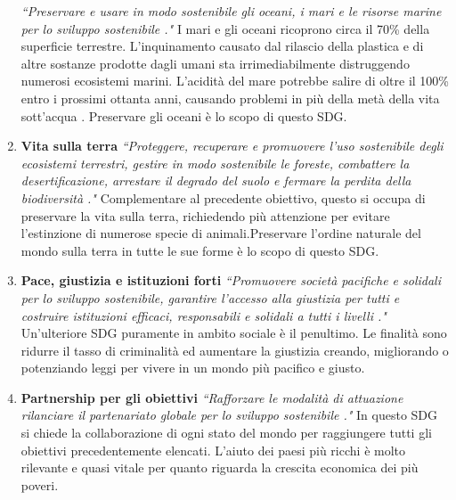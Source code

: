 \begin{enumerate}
\textit{``Preservare e usare in modo sostenibile gli oceani, i mari e le risorse marine per lo sviluppo sostenibile \cite{goals}."}\newline
I mari e gli oceani ricoprono circa il 70\% della superficie terrestre. L'inquinamento causato dal rilascio della plastica e di altre sostanze prodotte dagli umani sta irrimediabilmente distruggendo numerosi ecosistemi marini. L'acidità del mare potrebbe salire di oltre il 100\% entro i prossimi ottanta anni, causando problemi in più della metà della vita sott'acqua \cite{sdgs}.\newline
Preservare gli oceani è lo scopo di questo SDG.
\item \textbf{Vita sulla terra}\newline
\textit{``Proteggere, recuperare e promuovere l'uso sostenibile degli ecosistemi terrestri, gestire in modo sostenibile le foreste, combattere la desertificazione, arrestare il degrado del suolo e fermare la perdita della biodiversità \cite{goals}."}\newline
Complementare al precedente obiettivo, questo si occupa di preservare la vita sulla terra, richiedendo più attenzione per evitare l'estinzione di numerose specie di animali.\newline Preservare l'ordine naturale del mondo sulla terra in tutte le sue forme è lo scopo di questo SDG.
\item \textbf{Pace, giustizia e istituzioni forti}\newline
\textit{``Promuovere società pacifiche e solidali per lo sviluppo sostenibile, garantire l'accesso alla giustizia per tutti e costruire istituzioni efficaci, responsabili e solidali a tutti i livelli \cite{goals}."}\newline
Un'ulteriore SDG puramente in ambito sociale è il penultimo. Le finalità sono ridurre il tasso di criminalità ed aumentare la giustizia creando, migliorando o potenziando leggi per vivere in un mondo più pacifico e giusto.
\item \textbf{Partnership per gli obiettivi}\newline
\textit{``Rafforzare le modalità di attuazione rilanciare il partenariato globale per lo sviluppo sostenibile \cite{goals}."}\newline
In questo SDG si chiede la collaborazione di ogni stato del mondo per raggiungere tutti gli obiettivi precedentemente elencati. L'aiuto dei paesi più ricchi è molto rilevante e quasi vitale per quanto riguarda la crescita economica dei più poveri.
\end{enumerate}

